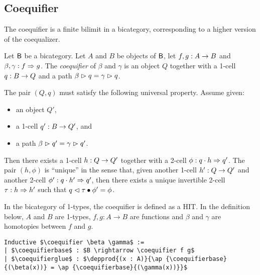 \subsection{Coequifier}
\label{sec:coequifier}

The coequifier is a finite bilimit in a bicategory, corresponding to a
higher version of the coequalizer.

\begin{definition}
Let $\mathsf{B}$ be a bicategory. Let $A$ and $B$ be objects of $\mathsf{B}$, let $f,
g : A \rightarrow B$ and $\beta,\gamma : f \Rightarrow
g$. The \emph{coequifier} of $\beta$ and $\gamma$ is an object $Q$
together with a 1-cell $q : B \rightarrow Q$ and a path
$\beta \vartriangleright q = \gamma \vartriangleright q$.

The pair $(Q,q)$ must satisfy the following universal
property. Assume given:
\begin{itemize}
\item an object $Q'$,
\item a 1-cell $q' : B \rightarrow Q'$, and
\item a path $\beta \vartriangleright q' = \gamma \vartriangleright q'$.
\end{itemize}
Then there exists a 1-cell $h : Q \rightarrow Q'$ together with a 2-cell
$\phi : q \cdot h \Rightarrow q'$. The pair $(h,\phi)$ is ``unique'' in the sense that,
given another 1-cell $h' : Q \rightarrow Q'$ and another 2-cell $\phi' :
q \cdot h' \Rightarrow q'$, then there exists a unique invertible 2-cell $\tau : h
\Rightarrow h'$ such that $q \vartriangleleft \tau \bullet \phi' = \phi$.
\end{definition}


In the bicategory of 1-types, the coequifier is defined as a HIT.  In
the definition below, $A$ and $B$ are 1-types, $f , g: A \to B$ are
functions and $\beta$ and $\gamma$ are homotopies between $f$ and $g$.
\begin{lstlisting}[mathescape=true]
Inductive $\coequifier \beta \gamma$ :=
| $\coequifierbase$ : $B \rightarrow \coequifier f g$
| $\coequifierglue$ : $\depprod{(x : A)}{\ap {\coequifierbase}{(\beta(x))} = \ap {\coequifierbase}{(\gamma(x))}}$
\end{lstlisting}

